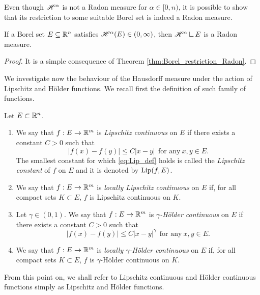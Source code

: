 Even though $\mathscr{H}^{\alpha}$ is not a Radon measure for $\alpha \in [0, n)$, it is possible to show that its restriction to some suitable Borel set is indeed a Radon measure.

\begin{proposition}
If a Borel set $E \subseteq \mathbb{R}^n$ satisfies $\mathscr{H}^{\alpha}(E) \in
(0,\infty)$, then $\Haus{\alpha} \res E$ is a Radon measure.
\end{proposition}
\begin{proof}
It is a simple consequence of Theorem \ref{thm:Borel_restriction_Radon}. 
\end{proof}

We investigate now the behaviour of the Hausdorff measure under the action of Lipschitz and H\"older functions. We recall first the definition of such family of functions.

\begin{definition} Let $E \subset \mathbb{R}^{n}$.
\begin{enumerate}[(1)]
\item We say that $f : E \to \mathbb{R}^{m}$ is {\em Lipschitz continuous} on $E$ if there exists a constant $C > 0$ such that
\begin{equation} \label{eq:Lip_def}
|f(x) - f(y)| \le C |x - y| \ \ \text{for any} \ x, y \in E.
\end{equation}
The smallest constant for which \eqref{eq:Lip_def} holds is called the {\em Lipschitz constant} of $f$ on $E$ and it is denoted by $\operatorname{Lip}(f, E)$. 
\item We say that $f : E \to \mathbb{R}^{m}$ is {\em locally Lipschitz continuous} on $E$ if, for all compact sets $K \subset E$, $f$ is Lipschitz continuous on $K$.
\item Let $\gamma \in (0,1)$. We say that $f: E \to \mathbb{R}^{m}$ is {\em $\gamma$-H\"older continuous} on $E$ if there exists a constant $C > 0$ such that
\begin{equation} \label{eq:Holder_def}
|f(x) - f(y)| \le C |x - y|^{\gamma} \ \ \text{for any} \ x, y \in E.
\end{equation}
\item We say that $f : E \to \mathbb{R}^{m}$ is {\em locally $\gamma$-H\"older continuous} on $E$ if, for all compact sets $K \subset E$, $f$ is $\gamma$-H\"older continuous on $K$.
\end{enumerate}
\end{definition}

From this point on, we shall refer to Lipschitz continuous and H\"older continuous functions simply as Lipschitz and H\"older functions. 

